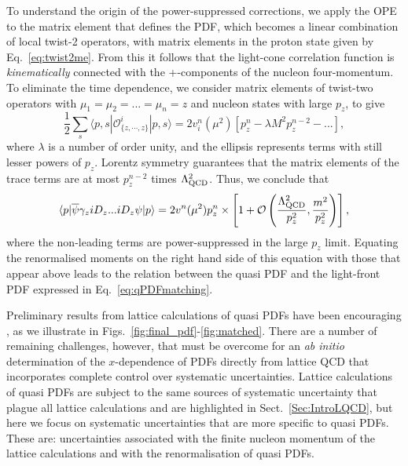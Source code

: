 To understand the origin of the power-suppressed corrections, we apply the OPE to the matrix element that defines the PDF, which becomes a linear combination of local twist-2 operators, with matrix elements in the proton state given by Eq.~\eqref{eq:twist2me}. From this it follows that the light-cone correlation function is {\it kinematically} connected with the +-components of the nucleon four-momentum. To eliminate the time dependence, we consider matrix elements of twist-two operators with $\mu_1=\mu_2=...=\mu_n=z$ and nucleon states with large $p_z$, to give
\begin{equation}
\frac{1}{2} \sum_s \langle p,s|\mathcal{O}^i_{\{z,\cdots,z\}}|p,s\rangle = 2v_i^n(\mu^2)\left[p_z^n-\lambda M^2 p_z^{n-2}-...\right], 
\end{equation}
where $\lambda$ is a number of order unity, and the ellipsis represents terms
with still lesser powers of $p_z$. Lorentz symmetry guarantees that the matrix elements of the trace terms are at most
$p_z^{n-2}$ times $\Lambda^2_{\rm QCD}$.  Thus, we conclude that
\begin{equation}
      \langle p| {\overline \psi}\gamma_ziD_z ... iD_z \psi|p\rangle
       = 2v^n(\mu^2) p_z^n\times \left[ 1 + {\cal O}\left(\frac{\Lambda^2_{\rm QCD}}{p_z^2},  \frac{m^2}{p_z^2}\right)\right],
\end{equation}
where the non-leading terms are power-suppressed in the large $p_z$ limit. Equating the renormalised moments on the right hand side of this equation with those that appear above
leads to the relation between the quasi PDF and the light-front
PDF expressed in Eq.~\eqref{eq:qPDFmatching}.

Preliminary results from lattice calculations of quasi PDFs have been encouraging \cite{Lin:2014zya,Alexandrou:2015rja,Chen:2016utp,Alexandrou:2016jqi}, as we illustrate in Figs.~\ref{fig:final_pdf}-\ref{fig:matched}. There are a number of remaining challenges, however, that must be overcome for an {\it ab initio} determination of the $x$-dependence of PDFs directly from lattice QCD that incorporates complete control over systematic uncertainties. Lattice calculations of quasi PDFs are subject to the same sources of systematic uncertainty that plague all lattice calculations and are highlighted in Sect.~\ref{Sec:IntroLQCD}, but here we focus on systematic uncertainties that are more specific to quasi PDFs. These are: uncertainties associated with the finite nucleon momentum of the lattice calculations and with the renormalisation of quasi PDFs.

